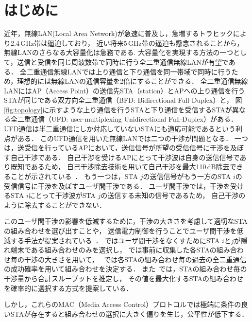 \documentclass[technicalreport]{ieicej}
\begin{document}

\maketitle

\section{はじめに}
	近年，無線LAN(Local Area Network)が急速に普及し，急増するトラヒックにより2.4\,GHz帯は逼迫しており，
	近い将来5\,GHz帯の逼迫も懸念されることから，無線LANのさらなる大容量化は急務である.
	大容量化を実現する方法の一つとして，送信と受信を同じ周波数帯で同時に行う全二重通信無線LANが有望である．
	全二重通信無線LANでは上り通信と下り通信を同一帯域で同時に行うため，理想的には無線LANの通信容量を2倍にすることができる．
	全二重通信無線LANにはAP（Access Point）の送信先STA（station）とAPへの上り通信を行うSTAが同じである双方向全二重通信（BFD: Bidirectional Full-Duplex）と，
	図\ref{fig:topology}に示すような上り通信を行うSTAと下り通信を受信するSTAが異なる全二重通信（UFD: user-multiplexing Unidirectional Full-Duplex）がある．
	UFD通信は半二重通信にしか対応していないSTAにも適応可能であるという利点がある．
	このUFD通信を用いた無線LANでは二つの干渉が問題となる．
	一つは，送受信を行っているAPにおいて，送信信号が所望の受信信号に干渉を及ぼす自己干渉である．
	自己干渉を受けるAPにとって干渉波は自身の送信信号であり既知であるため，
	自己干渉除去技術を用いて自己干渉を最大110\,dB除去できることが示されている~\cite{fdmac, stanford1}．
	もう一つは，STA $j$の送信信号がもう一方のSTA $i$の受信信号に干渉を及ぼすユーザ間干渉である．
	ユーザ間干渉では，干渉を受けるSTA $i$にとって干渉波がSTA $j$の送信する未知の信号であるため，
	自己干渉のように除去することができない．
	\par
	このユーザ間干渉の影響を低減するために，干渉の大きさを考慮して適切なSTAの組み合わせを選び出すことや，
	送信電力制御を行うことでユーザ間干渉を低減する手法が提案されている~\cite{fdmac3, goyal, janus, contra, promac}．
	\cite{fdmac3}ではユーザ間干渉をなくすためにSTA $i$と$j$が隠れ端末である組み合わせのみを選択し，
	\cite{goyal, janus}では事前に収集した各STAの組み合わせ毎の干渉の大きさを用いて，
	~\cite{contra}では各STAの組み合わせ毎の過去の全二重通信の成功確率を用いて組み合わせを決定する．
	また~\cite{promac}では，STAの組み合わせ毎の干渉量から合計スループットを推定し，
	その値を最大化するSTAの組み合わせを確率的に選択する方式を提案している．
	\par
	しかし，これらのMAC（Media Access Control）プロトコルでは極端に条件の良いSTAが存在すると組み合わせの選択に大きく偏りを生じ，公平性が低下する．
\end{document}

